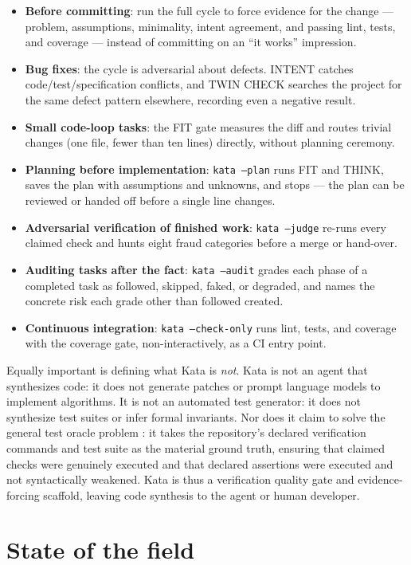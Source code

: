 \documentclass{sbc2019}%
\begin{document}
\begin{itemize}
\item \textbf{Before committing}: run the full cycle to force evidence for
the change --- problem, assumptions, minimality, intent agreement, and
passing lint, tests, and coverage --- instead of committing on an ``it works''
impression.
\item \textbf{Bug fixes}: the cycle is adversarial about defects. INTENT
catches code/test/specification conflicts, and TWIN CHECK searches the
project for the same defect pattern elsewhere, recording even a negative
result.
\item \textbf{Small code-loop tasks}: the FIT gate measures the diff and
routes trivial changes (one file, fewer than ten lines) directly, without
planning ceremony.
\item \textbf{Planning before implementation}: \texttt{kata --plan} runs FIT
and THINK, saves the plan with assumptions and unknowns, and stops --- the
plan can be reviewed or handed off before a single line changes.
\item \textbf{Adversarial verification of finished work}:
\texttt{kata --judge} re-runs every claimed check and hunts eight fraud
categories before a merge or hand-over.
\item \textbf{Auditing tasks after the fact}: \texttt{kata --audit} grades
each phase of a completed task as followed, skipped, faked, or degraded, and
names the concrete risk each grade other than followed created.
\item \textbf{Continuous integration}: \texttt{kata --check-only} runs lint,
tests, and coverage with the coverage gate, non-interactively, as a CI entry
point.
\end{itemize}

Equally important is defining what Kata is \emph{not}. Kata is not an agent
that synthesizes code: it does not generate patches or prompt language
models to implement algorithms. It is not an automated test generator: it
does not synthesize test suites or infer formal invariants. Nor does it
claim to solve the general test oracle problem \cite{barr-oracle}: it takes
the repository's declared verification commands and test suite as the
material ground truth, ensuring that claimed checks were genuinely executed
and that declared assertions were executed and not syntactically weakened. Kata is thus a
verification quality gate and evidence-forcing scaffold, leaving code
synthesis to the agent or human developer.

\section{State of the field}
\label{sec:field}
\end{document}
